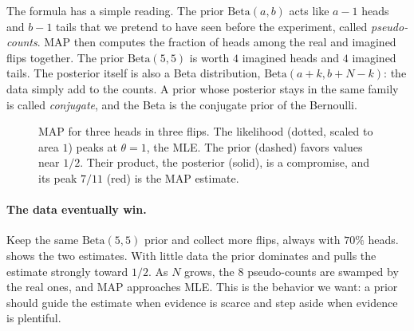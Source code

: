 The formula has a simple reading. The prior $\text{Beta}(a, b)$ acts
like $a - 1$ heads and $b - 1$ tails that we pretend to have seen before
the experiment, called \emph{pseudo-counts}. MAP then computes the
fraction of heads among the real and imagined flips together. The prior
$\text{Beta}(5, 5)$ is worth $4$ imagined heads and $4$ imagined tails.
The posterior itself is also a Beta distribution, $\text{Beta}(a + k,
b + N - k)$: the data simply add to the counts. A prior whose posterior
stays in the same family is called \emph{conjugate}, and the Beta is the
conjugate prior of the Bernoulli.

\begin{figure}[ht]
  \centering
  \caption{MAP for three heads in three flips. The likelihood (dotted,
    scaled to area $1$) peaks at $\theta = 1$, the MLE. The prior
    (dashed) favors values near $1/2$. Their product, the posterior
    (solid), is a compromise, and its peak $7/11$ (red) is the MAP
    estimate.}
  \label{fig:ch06-map}
\end{figure}

\paragraph{The data eventually win.}
Keep the same $\text{Beta}(5, 5)$ prior and collect more flips, always
with $70\%$ heads.  shows the two estimates.
With little data the prior dominates and pulls the estimate strongly
toward $1/2$. As $N$ grows, the $8$ pseudo-counts are swamped by the real
ones, and MAP approaches MLE. This is the behavior we want: a prior
should guide the estimate when evidence is scarce and step aside when
evidence is plentiful.

